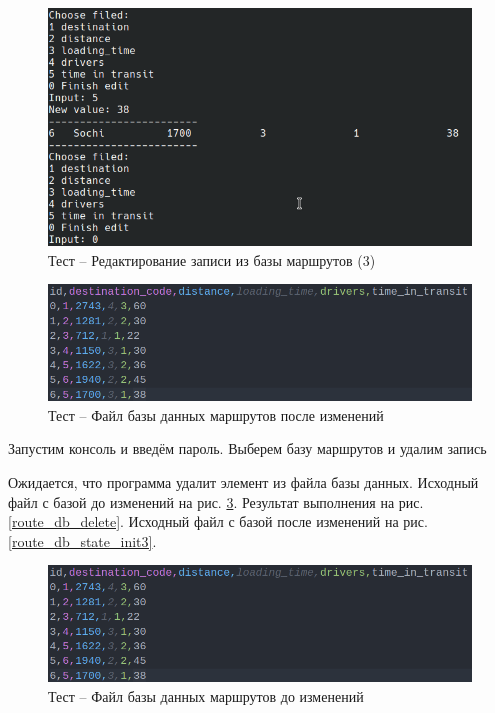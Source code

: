 \begin{figure}[H]
	\centering
	\includegraphics[width=0.8\linewidth]{photo/tests/admin/route_db_edit_3}
	\caption{Тест -- Редактирование записи из базы маршрутов (3)}
	\label{route_db_edit_3}
\end{figure}

\begin{figure}[H]
	\centering
	\includegraphics[width=0.7\linewidth]{photo/tests/admin/route_db_state_edit}
	\caption{Тест -- Файл базы данных маршрутов после изменений}
	\label{route_db_state_edit}
\end{figure}

Запустим консоль и введём пароль. 
Выберем базу маршрутов и удалим запись

Ожидается, что программа удалит элемент из файла базы данных.
Исходный файл с базой до изменений на рис. \ref{route_db_state_edit2}.
Результат выполнения на рис. \ref{route_db_delete}.
Исходный файл с базой после изменений на рис. \ref{route_db_state_init3}.

\begin{figure}[H]
	\centering
	\includegraphics[width=0.7\linewidth]{photo/tests/admin/route_db_state_edit}
	\caption{Тест -- Файл базы данных маршрутов до изменений}
	\label{route_db_state_edit2}
\end{figure}

